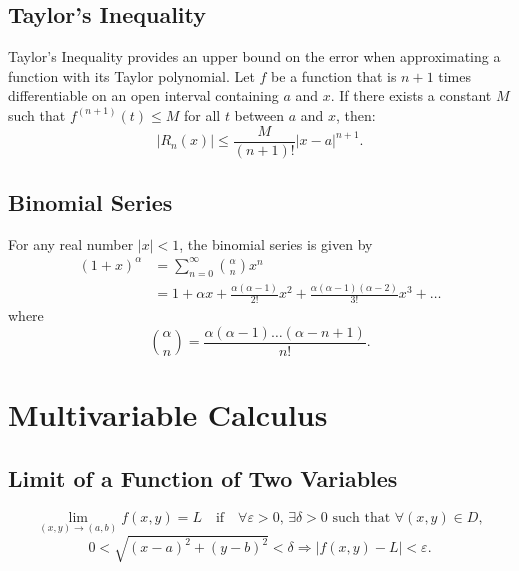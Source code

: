 \documentclass[a4paper,11pt]{article}
\begin{document}


\subsection{Taylor's Inequality}

\begin{tcolorbox}
    Taylor's Inequality provides an upper bound on the error when approximating a function with its Taylor polynomial. Let $f$ be a function that is $n+1$ times differentiable on an open interval containing $a$ and $x$. If there exists a constant $M$ such that $f^{(n+1)} (t) \leq M$ for all $t$ between $a$ and $x$, then:
    \[
    \left| R_n(x) \right| \leq \frac{M}{(n+1)!} \left| x - a \right|^{n+1}.
    \]
\end{tcolorbox}




\subsection{Binomial Series}

\begin{tcolorbox}
    For any real number $|x|<1$, the binomial series is given by
    \begin{align*}
        (1+x)^\alpha &= \sum_{n=0}^{\infty} \binom{\alpha}{n} x^n \\
        &= 1 + \alpha x + \frac{\alpha(\alpha-1)}{2!}x^2 + \frac{\alpha(\alpha-1)(\alpha-2)}{3!}x^3+\dots
    \end{align*}
    where
    \[
    \binom{\alpha}{n} = \frac{\alpha(\alpha-1)\dots(\alpha-n+1)}{n!}.
    \]
\end{tcolorbox}




\section{Multivariable Calculus}




\subsection{Limit of a Function of Two Variables}

\begin{tcolorbox}
    \[
    \lim_{(x,y) \to (a,b)} f(x, y) = L \quad \text{if} \quad \forall \varepsilon > 0, \, \exists \delta > 0 \text{ such that } \forall (x,y) \in D, 
    \]
    \[
    0 < \sqrt{(x-a)^2 +(y-b)^2} < \delta \Rightarrow |f(x, y) - L| < \varepsilon.
    \]
\end{tcolorbox}
\end{document}
